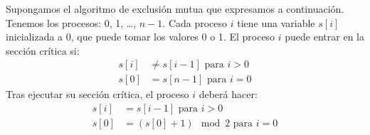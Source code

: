 \begin{ejercicio}
    Supongamos el algoritmo de exclusión mutua que expresamos a continuación. Tenemos los procesos: 0, 1, \ldots, $n-1$. Cada proceso $i$ tiene una variable $s[i]$ inicializada a 0, que puede tomar los valores 0 o 1. El proceso $i$ puede entrar en la sección crítica si:
    \begin{align*}
        s[i] &\neq s[i-1] \text{\ para\ } i>0 \\
        s[0] &= s[n-1] \text{\ para\ } i = 0
    \end{align*}
    Tras ejecutar su sección crítica, el proceso $i$ deberá hacer:
    \begin{align*}
        s[i] &= s[i-1] \text{\ para\ } i> 0 \\
        s[0] &= (s[0] +1 ) \mod 2 \text{\ para\ } i = 0
    \end{align*}
\end{ejercicio}

